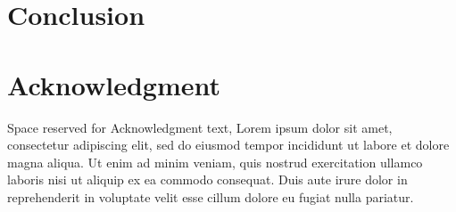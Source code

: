 \documentclass[conference]{IEEEtran}
\begin{document}
\section{Conclusion}
\label{sec:conclusions}


\section*{Acknowledgment}
Space reserved for Acknowledgment text, Lorem ipsum dolor sit amet, consectetur adipiscing elit,
sed do eiusmod tempor incididunt ut labore et dolore magna aliqua. Ut enim ad minim veniam, quis 
nostrud exercitation ullamco laboris nisi ut aliquip ex ea commodo consequat. Duis aute irure dolor
in reprehenderit in voluptate velit esse cillum dolore eu fugiat nulla pariatur. 







%
%
%


\end{document}
